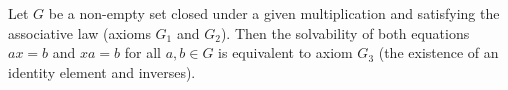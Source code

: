 Let $G$ be a non-empty set closed under a given multiplication and satisfying the associative law (axioms $G_1$ and $G_2$). Then the solvability of both equations $ax = b$ and $xa = b$ for all $a, b \in G$ is equivalent to axiom $G_3$ (the existence of an identity element and inverses).
